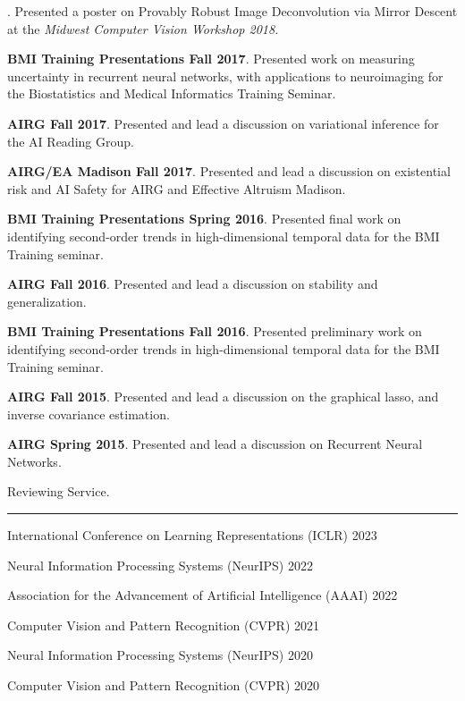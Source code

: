 \documentclass[]{article}
\begin{document}
. Presented a poster on Provably Robust Image Deconvolution via Mirror Descent at the \textit{Midwest Computer Vision Workshop 2018.}

\noindent \textbf{BMI Training Presentations Fall 2017}. Presented work on measuring uncertainty in recurrent neural networks, with applications to neuroimaging for the Biostatistics and Medical Informatics Training Seminar.

\noindent \textbf{AIRG Fall 2017}. Presented and lead a discussion on variational inference for the AI Reading Group.

\noindent \textbf{AIRG/EA Madison Fall 2017}. Presented and lead a discussion on existential risk and AI Safety for AIRG and Effective Altruism Madison.

\noindent \textbf{BMI Training Presentations Spring 2016}. Presented final work on identifying second-order trends in high-dimensional temporal data for the BMI Training seminar.

\noindent \textbf{AIRG Fall 2016}. Presented and lead a discussion on stability and generalization.

\noindent \textbf{BMI Training Presentations Fall 2016}. Presented preliminary work on identifying second-order trends in high-dimensional temporal data for the BMI Training seminar.

\noindent \textbf{AIRG Fall 2015}. Presented and lead a discussion on the graphical lasso, and inverse covariance estimation.

\noindent \textbf{AIRG Spring 2015}. Presented and lead a discussion on Recurrent Neural Networks.

\fi

\iffalse
\vspace{20pt}
{\LARGE Reviewing Service.}
\vspace{3pt}
\hrule
\vspace{10pt}

\noindent International Conference on Learning Representations (ICLR) \hfill 2023

\noindent Neural Information Processing Systems (NeurIPS) \hfill 2022

\noindent Association for the Advancement of Artificial Intelligence (AAAI) \hfill 2022

\noindent Computer Vision and Pattern Recognition (CVPR) \hfill 2021

\noindent Neural Information Processing Systems (NeurIPS) \hfill 2020

\noindent Computer Vision and Pattern Recognition (CVPR) \hfill 2020
\end{document}
